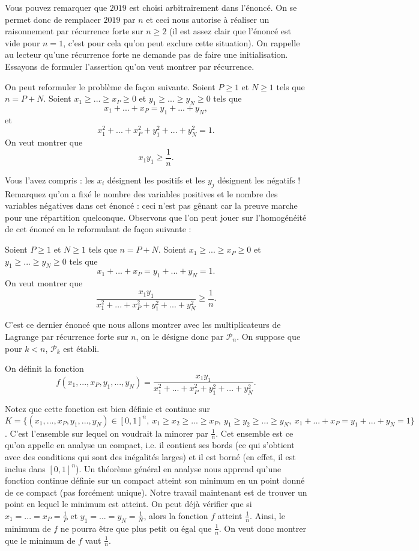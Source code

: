 \begin{sol}
Vous pouvez remarquer que $2019$ est choisi arbitrairement dans l'énoncé. On se permet donc de remplacer $2019$ par $n$ et ceci nous autorise à réaliser un raisonnement par récurrence forte sur $n \geq 2$ (il est assez clair que l'énoncé est vide pour $n=1$, c'est pour cela qu'on peut exclure cette situation). On rappelle au lecteur qu'une récurrence forte ne demande pas de faire une initialisation. Essayons de formuler l'assertion qu'on veut montrer par récurrence.

On peut reformuler le problème de façon suivante. Soient $P \geq 1$ et $N \geq 1$ tels que $n=P+N$. Soient $x_1\geq...\geq x_P \geq 0$ et $y_1 \geq ...\geq y_N \geq 0$ tels que 
\[
x_1 + ... + x_P = y_1 + ... + y_N,
\]
et
\[
x_1^2 + ... + x_P^2 + y_1^2 + ... + y_N^2 = 1.
\]
On veut montrer que 
\[
x_1 y_1 \geq \frac1{n}.
\]

Vous l'avez compris : les $x_i$ désignent les positifs et les $y_j$ désignent les négatifs ! Remarquez qu'on a fixé le nombre des variables positives et le nombre des variables négatives dans cet énoncé : ceci n'est pas gênant car la preuve marche pour une répartition quelconque. Observons que l'on peut jouer sur l'homogénéité de cet énoncé en le reformulant de façon suivante :

Soient $P \geq 1$ et $N \geq 1$ tels que $n=P+N$. Soient $x_1\geq...\geq x_P \geq 0$ et $y_1 \geq ...\geq y_N \geq 0$ tels que 
\[
x_1 + ... + x_P = y_1 + ... + y_N = 1.
\]
On veut montrer que
\[
\frac{x_1 y_1}{x_1^2 + ... + x_P^2 + y_1^2 + ... + y_N^2} \geq \frac1{n}.
\]

C'est ce dernier énoncé que nous allons montrer avec les multiplicateurs de Lagrange par récurrence forte sur $n$, on le désigne donc par $\mathcal{P}_n$. On suppose que pour $k<n$, $\mathcal{P}_k$ est établi.

On définit la fonction
\[
f(x_1,...,x_P,y_1,...,y_N)=\frac{x_1 y_1}{x_1^2 + ... + x_P^2 + y_1^2 + ... + y_N^2}.
\]

Notez que cette fonction est bien définie et continue sur $K=\{(x_1,...,x_P,y_1,...,y_N) \in [0,1]^{n},\ x_1 \geq x_2 \geq ... \geq x_P,\ y_1 \geq y_2 \geq ... \geq y_N,\ x_1 + ... + x_P = y_1 + ... + y_N = 1 \}$. C'est l'ensemble sur lequel on voudrait la minorer par $\frac1{n}$. Cet ensemble est ce qu'on appelle en analyse un compact, i.e. il contient ses bords (ce qui s'obtient avec des conditions qui sont des inégalités larges) et il est borné (en effet, il est inclus dans $[0,1]^{n}$). Un théorème général en analyse nous apprend qu'une fonction continue définie sur un compact atteint son minimum en un point donné de ce compact (pas forcément unique). Notre travail maintenant est de trouver un point en lequel le minimum est atteint. On peut déjà vérifier que si $x_1 = ... = x_P = \frac1{P}$ et $y_1 = ... =y_N = \frac1{N}$, alors la fonction $f$ atteint $\frac1{n}$. Ainsi, le minimum de $f$ ne pourra être que plus petit ou égal que $\frac1{n}$. On veut donc montrer que le minimum de $f$ vaut $\frac1{n}$.


\end{sol}

